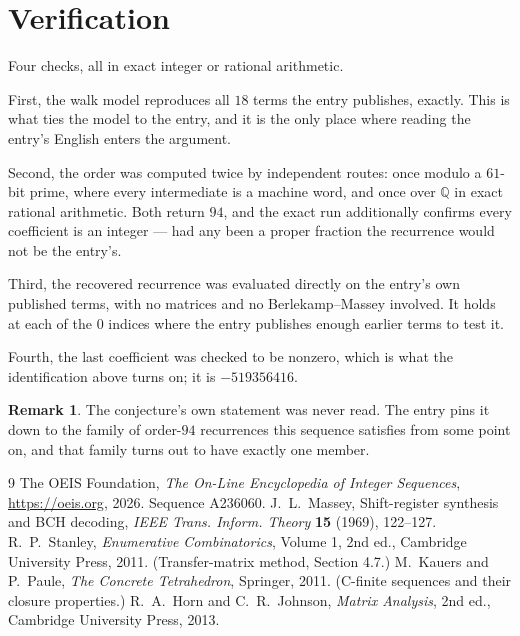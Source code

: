 \documentclass[11pt,a4paper]{article}
\theoremstyle{plain}
\theoremstyle{definition}
\newtheorem{remark}[theorem]{Remark}
\begin{document}
\section{Verification}

Four checks, all in exact integer or rational arithmetic.

First, the walk model reproduces all $18$ terms the entry publishes, exactly. This is
what ties the model to the entry, and it is the only place where reading the entry's English
enters the argument.

Second, the order was computed twice by independent routes: once modulo a $61$-bit prime, where
every intermediate is a machine word, and once over $\mathbb{Q}$ in exact rational arithmetic.
Both return $94$, and the exact run additionally confirms every coefficient is an integer
--- had any been a proper fraction the recurrence would not be the entry's.

Third, the recovered recurrence was evaluated directly on the entry's own published terms, with
no matrices and no Berlekamp--Massey involved. It holds at each of the $0$ indices where
the entry publishes enough earlier terms to test it.

Fourth, the last coefficient was checked to be nonzero, which is what the identification above
turns on; it is $-519356416$.

\begin{remark}
The conjecture's own statement was never read. The entry pins it down to the family of
order-$94$ recurrences this sequence satisfies from some point on, and that family turns
out to have exactly one member.
\end{remark}

\begin{thebibliography}{9}
 The OEIS Foundation, \emph{The On-Line Encyclopedia of Integer
Sequences}, \url{https://oeis.org}, 2026. Sequence A236060.
 J.~L.~Massey, Shift-register synthesis and BCH decoding, \emph{IEEE
Trans. Inform. Theory} \textbf{15} (1969), 122--127.
 R.~P.~Stanley, \emph{Enumerative Combinatorics}, Volume 1, 2nd ed.,
Cambridge University Press, 2011. (Transfer-matrix method, Section 4.7.)
 M.~Kauers and P.~Paule, \emph{The Concrete Tetrahedron}, Springer, 2011.
(C-finite sequences and their closure properties.)
 R.~A.~Horn and C.~R.~Johnson, \emph{Matrix Analysis}, 2nd ed., Cambridge
University Press, 2013.
\end{thebibliography}
\end{document}
